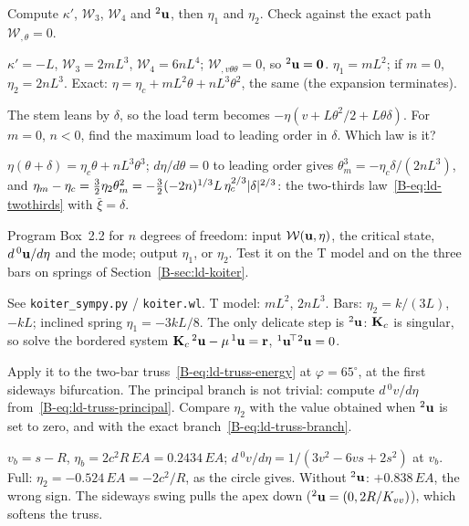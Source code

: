 \q Compute $\kappa'$, $\mathcal{W}_3$, $\mathcal{W}_4$ and ${}^2\mathbf{u}$, then $\eta_1$ and
$\eta_2$. Check against the exact path $\mathcal{W}_{,\theta} = 0$.
\begin{answer}
$\kappa' = -L$, $\mathcal{W}_3 = 2mL^3$, $\mathcal{W}_4 = 6nL^4$; $\mathcal{W}_{,v\theta\theta} = 0$, so
${}^2\mathbf{u} = \mathbf{0}$. $\eta_1 = mL^2$; if $m = 0$, $\eta_2 = 2nL^3$. Exact:
$\eta = \eta_c + mL^2\theta + nL^3\theta^2$, the same (the expansion terminates).
\end{answer}

\q The stem leans by $\delta$, so the load term becomes $-\eta(v + L\theta^2/2 + L\theta\delta)$.
For $m = 0$, $n < 0$, find the maximum load to leading order in $\delta$. Which law is it?
\begin{answer}
$\eta(\theta + \delta) = \eta_c\theta + nL^3\theta^3$; $d\eta/d\theta = 0$ to leading order gives
$\theta_m^3 = -\eta_c\delta/(2nL^3)$, and $\eta_m - \eta_c = \tfrac32\eta_2\theta_m^2
= -\tfrac32(-2n)^{1/3}L\,\eta_c^{2/3}\lvert \delta\rvert^{2/3}$: the two-thirds
law~\eqref{B-eq:ld-twothirds} with $\bar\xi = \delta$.
\end{answer}


\qc Program Box~2.2 for $n$ degrees of freedom: input $\mathcal{W}(\mathbf{u},\eta)$, the
critical state, $d\,{}^0\mathbf{u}/d\eta$ and the mode; output $\eta_1$, or $\eta_2$. Test it on
the T model and on the three bars on springs of Section~\ref{B-sec:ld-koiter}.
\begin{answer}
See \texttt{koiter\_sympy.py} / \texttt{koiter.wl}. T model: $mL^2$, $2nL^3$. Bars:
$\eta_2 = k/(3L)$, $-kL$; inclined spring $\eta_1 = -3kL/8$. The only delicate step is
${}^2\mathbf{u}$: $\mathbf{K}_c$ is singular, so solve the bordered system
$\mathbf{K}_c\,{}^2\mathbf{u} - \mu\,{}^1\mathbf{u} = \mathbf{r}$, ${}^1\mathbf{u}^{\!\top}{}^2\mathbf{u} = 0$.
\end{answer}

\qc Apply it to the two-bar truss~\eqref{B-eq:ld-truss-energy} at $\varphi = 65^\circ$, at the
first sideways bifurcation. The principal branch is not trivial: compute
$d\,{}^0v/d\eta$ from~\eqref{B-eq:ld-truss-principal}. Compare $\eta_2$ with the value
obtained when ${}^2\mathbf{u}$ is set to zero, and with the exact
branch~\eqref{B-eq:ld-truss-branch}.
\begin{answer}
$v_b = s - R$, $\eta_b = 2c^2R\,EA = 0.2434\,EA$; $d\,{}^0v/d\eta = 1/(3v^2 - 6vs + 2s^2)$ at
$v_b$. Full: $\eta_2 = -0.524\,EA = -2c^2/R$, as the circle gives. Without ${}^2\mathbf{u}$:
$+0.838\,EA$, the wrong sign. The sideways swing pulls the apex down
(${}^2\mathbf{u} = (0, 2R/K_{vv})$), which softens the truss.
\end{answer}


